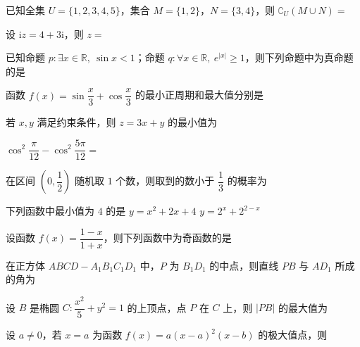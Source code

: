 \documentclass[a4paper,11pt]{report}
\begin{document}
\begin{examquestions}

\item 已知全集 $U=\{1,2,3,4,5\}$，集合 $M=\{1,2\}$，$N=\{3,4\}$，则 $\complement_U(M\cup N)=$

\item 设 $\mathrm{i}z=4+3\mathrm{i}$，则 $z=$

\item 已知命题 $p:\exists x\in\mathbb R,\ \sin x<1$；命题 $q:\forall x\in\mathbb R,\ e^{|x|}\geq1$，则下列命题中为真命题的是

\item 函数 $f(x)=\sin\dfrac{x}{3}+\cos\dfrac{x}{3}$ 的最小正周期和最大值分别是

\item 若 $x,y$ 满足约束条件，则 $z=3x+y$ 的最小值为

\item $\cos^2\dfrac{\pi}{12}-\cos^2\dfrac{5\pi}{12}=$
\fourchoices
{}
{}
{}
{}

\item 在区间 $\left(0,\dfrac12\right)$ 随机取 $1$ 个数，则取到的数小于 $\dfrac13$ 的概率为

\item 下列函数中最小值为 $4$ 的是
\twochoices
{$y=x^2+2x+4$}
{}
{$y=2^x+2^{2-x}$}
{}

\item 设函数 $f(x)=\dfrac{1-x}{1+x}$，则下列函数中为奇函数的是

\item 在正方体 $ABCD-A_1B_1C_1D_1$ 中，$P$ 为 $B_1D_1$ 的中点，则直线 $PB$ 与 $AD_1$ 所成的角为
\fourchoices
{}
{}
{}
{}

\item 设 $B$ 是椭圆 $C:\dfrac{x^2}{5}+y^2=1$ 的上顶点，点 $P$ 在 $C$ 上，则 $|PB|$ 的最大值为

\item 设 $a\ne0$，若 $x=a$ 为函数 $f(x)=a(x-a)^2(x-b)$ 的极大值点，则

\end{examquestions}
\end{document}
